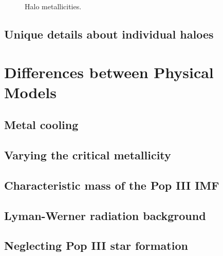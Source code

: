 \documentclass[useAMS,usenatbib]{mn2e}
\begin{document}
\begin{figure}
  \caption{\label{fig:ztot} Halo metallicities.}
\end{figure}


\subsection{Unique details about individual haloes}

\section{Differences between Physical Models}
\label{sec:models}

\subsection{Metal cooling}

\subsection{Varying the critical metallicity}

\subsection{Characteristic mass of the Pop III IMF}

\subsection{Lyman-Werner radiation background}

\subsection{Neglecting Pop III star formation}
\end{document}
